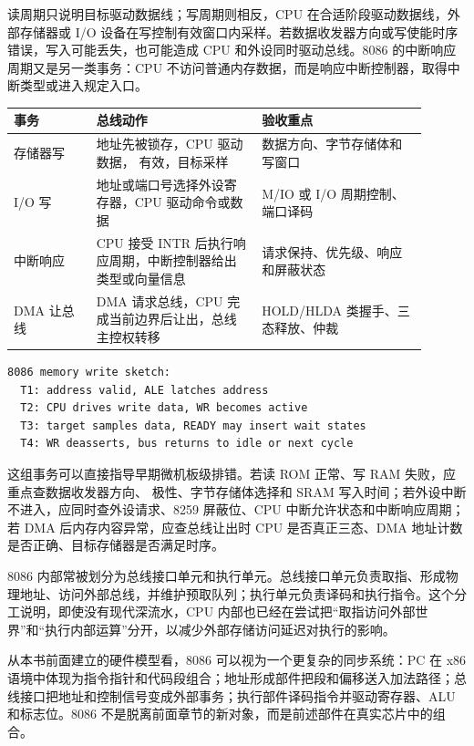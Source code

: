 读周期只说明目标驱动数据线；写周期则相反，CPU 在合适阶段驱动数据线，外部存储器或 I/O 设备在写控制有效窗口内采样。若数据收发器方向或写使能时序错误，写入可能丢失，也可能造成 CPU 和外设同时驱动总线。8086 的中断响应周期又是另一类事务：CPU 不访问普通内存数据，而是响应中断控制器，取得中断类型或进入规定入口。

\begin{longtable}{L{0.18\linewidth}L{0.36\linewidth}L{0.36\linewidth}}
\toprule
事务 & 总线动作 & 验收重点 \\
\midrule
存储器写 & 地址先被锁存，CPU 驱动数据， 有效，目标采样 & 数据方向、字节存储体和写窗口 \\
I/O 写 & 地址或端口号选择外设寄存器，CPU 驱动命令或数据 & M/IO 或 I/O 周期控制、端口译码 \\
中断响应 & CPU 接受 INTR 后执行响应周期，中断控制器给出类型或向量信息 & 请求保持、优先级、响应和屏蔽状态 \\
DMA 让总线 & DMA 请求总线，CPU 完成当前边界后让出，总线主控权转移 & HOLD/HLDA 类握手、三态释放、仲裁 \\
\bottomrule
\end{longtable}

\begin{lstlisting}
8086 memory write sketch:
  T1: address valid, ALE latches address
  T2: CPU drives write data, WR becomes active
  T3: target samples data, READY may insert wait states
  T4: WR deasserts, bus returns to idle or next cycle
\end{lstlisting}

这组事务可以直接指导早期微机板级排错。若读 ROM 正常、写 RAM 失败，应重点查数据收发器方向、 极性、字节存储体选择和 SRAM 写入时间；若外设中断不进入，应同时查外设请求、8259 屏蔽位、CPU 中断允许状态和中断响应周期；若 DMA 后内存内容异常，应查总线让出时 CPU 是否真正三态、DMA 地址计数是否正确、目标存储器是否满足时序。

8086 内部常被划分为总线接口单元和执行单元。总线接口单元负责取指、形成物理地址、访问外部总线，并维护预取队列；执行单元负责译码和执行指令。这个分工说明，即使没有现代深流水，CPU 内部也已经在尝试把“取指访问外部世界”和“执行内部运算”分开，以减少外部存储访问延迟对执行的影响。

从本书前面建立的硬件模型看，8086 可以视为一个更复杂的同步系统：PC 在 x86 语境中体现为指令指针和代码段组合；地址形成部件把段和偏移送入加法路径；总线接口把地址和控制信号变成外部事务；执行部件译码指令并驱动寄存器、ALU 和标志位。8086 不是脱离前面章节的新对象，而是前述部件在真实芯片中的组合。

